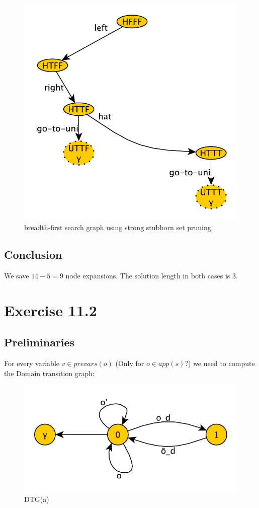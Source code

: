 \documentclass[11pt,a4paper]{article}
\begin{document}
\begin{figure}[h!]
\centering
\includegraphics[scale=0.7]{breadthFirstStrongStubborn}
\caption{breadth-first search graph using strong stubborn set pruning}
\end{figure}

\subsection*{Conclusion}
We save $14-5=9$ node expansions. The solution length in both cases is 3.

\section*{Exercise 11.2}

\subsection*{Preliminaries}
For every variable $ v \in prevars(o) $ (Only for $o \in app(s)$?) we need to compute the Domain transition graph:
\begin{figure}[h!]
\centering
\includegraphics[scale=0.5]{DTG_a}
\caption{DTG(a)}
\end{figure}
\end{document}
